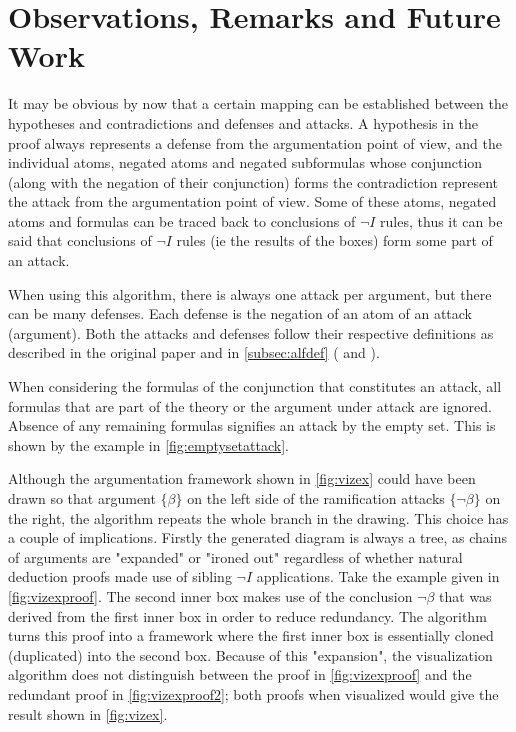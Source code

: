 \documentclass[11pt,twoside,a4paper]{report}
\begin{document}
\section{Observations, Remarks and Future Work}
\label{sec:vizmarks}
It may be obvious by now that a certain mapping can be established between the hypotheses and contradictions and defenses and attacks. A hypothesis in the proof always represents a defense from the argumentation point of view, and the individual atoms, negated atoms and negated subformulas whose conjunction (along with the negation of their conjunction) forms the contradiction represent the attack from the argumentation point of view. Some of these atoms, negated atoms and formulas can be traced back to conclusions of $\neg I$ rules, thus it can be said that conclusions of $\neg I$ rules (ie the results of the boxes) form some part of an attack.

When using this algorithm, there is always one attack per argument, but there can be many defenses. Each defense is the negation of an atom of an attack (argument). Both the attacks and defenses follow their respective definitions as described in the original paper and in \autoref{subsec:alfdef} ( and ).

When considering the formulas of the conjunction that constitutes an attack, all formulas that are part of the theory or the argument under attack are ignored. Absence of any remaining formulas signifies an attack by the empty set. This is shown by the example in \autoref{fig:emptysetattack}.

Although the argumentation framework shown in \autoref{fig:vizex} could have been drawn so that argument $\{\beta\}$ on the left side of the ramification attacks $\{\neg\beta\}$ on the right, the algorithm repeats the whole branch in the drawing. This choice has a couple of implications. Firstly the generated diagram is always a tree, as chains of arguments are "expanded" or "ironed out" regardless of whether natural deduction proofs made use of sibling $\neg I$ applications. Take the example given in \autoref{fig:vizexproof}. The second inner box makes use of the conclusion $\neg\beta$ that was derived from the first inner box in order to reduce redundancy. The algorithm turns this proof into a framework where the first inner box is essentially cloned (duplicated) into the second box. Because of this "expansion", the visualization algorithm does not distinguish between the proof in \autoref{fig:vizexproof} and the redundant proof in \autoref{fig:vizexproof2}; both proofs when visualized would give the result shown in \autoref{fig:vizex}.
\end{document}
